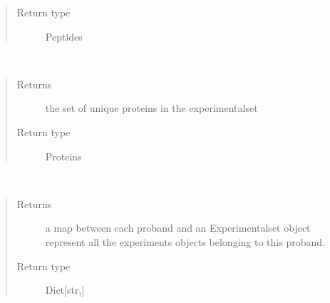 \documentclass[letterpaper,10pt,english]{sphinxmanual}
\begin{document}
\begin{fulllineitems}
\begin{fulllineitems}
\begin{quote}
\begin{description}
\item[{Return type}] \leavevmode
Peptides

\end{description}\end{quote}

\end{fulllineitems}


\begin{fulllineitems}
\label{\detokenize{IPTK.Classes:IPTK.Classes.ExperimentalSet.ExperimentSet.get_unique_proteins}}~\begin{quote}\begin{description}
\item[{Returns}] \leavevmode
the set of unique proteins in the experimentalset

\item[{Return type}] \leavevmode
Proteins

\end{description}\end{quote}

\end{fulllineitems}


\begin{fulllineitems}
\label{\detokenize{IPTK.Classes:IPTK.Classes.ExperimentalSet.ExperimentSet.group_by_proband}}~\begin{quote}\begin{description}
\item[{Returns}] \leavevmode
a map between each proband and an Experimentalset object represent all the experiments objects         belonging to this proband.

\item[{Return type}] \leavevmode
Dict{[}str,{\hyperref[\detokenize{IPTK.Classes:IPTK.Classes.ExperimentalSet.ExperimentSet}]{}}{]}


\end{description}
\end{quote}
\end{fulllineitems}
\end{fulllineitems}
\end{document}
